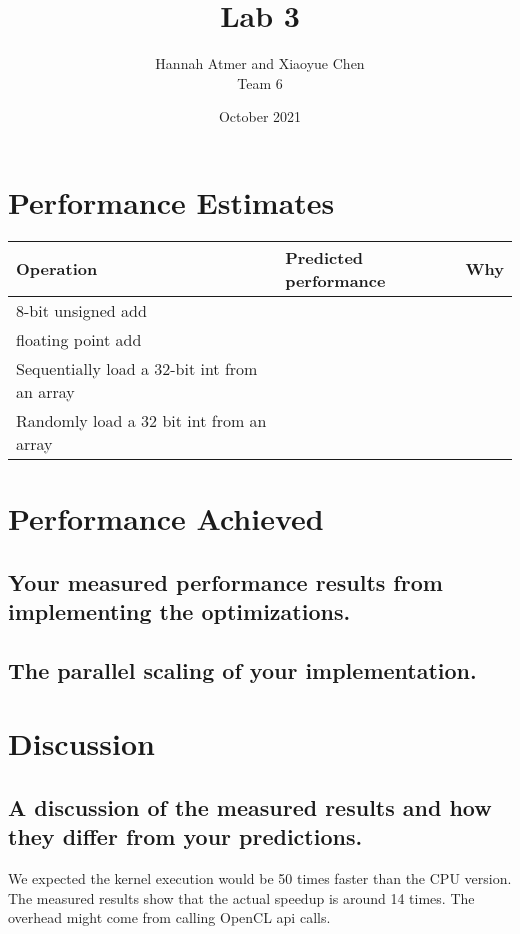 \documentclass{article}
\title{Lab 3}
\author{Hannah Atmer and Xiaoyue Chen \\ Team 6}
\date{October 2021}
\begin{document}
\maketitle

\section{Performance Estimates}
  \begin{table}[h]
    \centering
    \begin{tabular}{p{}p{}p{}}
      \toprule
      Operation & Predicted performance & Why \\
      \midrule
      8-bit unsigned add & & \\
      floating point add & & \\
      Sequentially load a 32-bit int from an array & & \\
      Randomly load a 32 bit int from an array & & \\
      \bottomrule
    \end{tabular}
  \end{table}


\section{Performance Achieved}

\subsection{Your measured performance results from implementing the optimizations.}

\subsection{The parallel scaling of your implementation.}

\section{Discussion}

\subsection{A discussion of the measured results and how they differ
  from your predictions.}
We expected the kernel execution would be 50 times faster than the CPU
version. The measured results show that the actual speedup is around
14 times. The overhead might come from calling OpenCL api calls.
\end{document}
